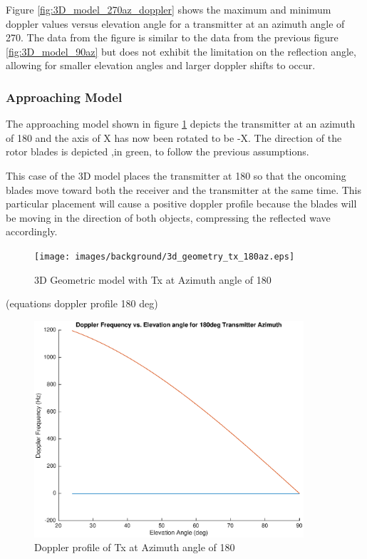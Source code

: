 Figure \ref{fig:3D_model_270az_doppler} shows the maximum and minimum doppler values versus elevation angle for a transmitter at an azimuth angle of 270\textdegree. The data from the figure is similar to the data from the previous figure \ref{fig:3D_model_90az} but does not exhibit the limitation on the reflection angle, allowing for smaller elevation angles and larger doppler shifts to occur.

\subsubsection{Approaching Model}
The approaching model shown in figure \ref{fig:3D_model_180az} depicts the transmitter at an azimuth of 180 \textdegree \space and the axis of X has now been rotated to be -X. The direction of the rotor blades is depicted ,in green, to follow the previous assumptions.

This case of the 3D model places the transmitter at 180 \textdegree \space so that the oncoming blades move toward both the receiver and the transmitter at the same time. This particular placement will cause a positive doppler profile because the blades will be moving in the direction of both objects, compressing the reflected wave accordingly.

\begin{figure}
	\begin{center}
		\texttt{[image: images/background/3d\_geometry\_tx\_180az.eps]}
		\caption{3D Geometric model with Tx at Azimuth angle of 180\textdegree}
		\label{fig:3D_model_180az}
	\end{center}
\end{figure}

(equations doppler profile 180 deg)

\begin{figure}
	\begin{center}
		\includegraphics[width=10cm]{images/background/3d_geometry_tx_180az_doppler_profile.eps}
		\caption{Doppler profile of Tx at Azimuth angle of 180\textdegree}
		\label{fig:3D_model_180az_doppler}
	\end{center}
\end{figure}

